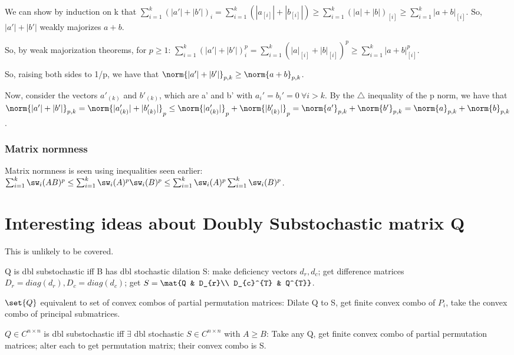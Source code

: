 \documentclass[10pt]{amsart}
\begin{document}
We can show by induction on k that $\sum_{i=1}^{k}(|a'| + |b'|)_{i} =  \sum_{i=1}^{k} (|a_{[i]}| + |b_{[i]}|) \geq \sum_{i=1}^{k} (|a| + |b|)_{[i]} \geq \sum_{i=1}^{k}|a+b|_{[i]}$. So, $|a'| + |b'|$ weakly majorizes $a + b$.

So, by weak majorization theorems, for $p \geq 1$: $\sum_{i=1}^{k} (|a'| + |b'|)_{i}^{p} = \sum_{i=1}^{k} (|a|_{[i]} + |b|_{[i]})^{p} \geq \sum_{i=1}^{k}|a+b|_{[i]}^{p}$.

So, raising both sides to 1/p, we have that $\norm{|a'| + |b'|}_{p, k} \geq \norm{a+b}_{p, k}$.

Now, consider the vectors $a'_{(k)}$ and $b'_{(k)}$, which are a' and b' with $a_{i}' = b_{i}' = 0\ \forall i>k$. By the $\triangle$ inequality of the p norm, we have that $\norm{|a'| + |b'|}_{p, k} = \norm{|a'_{(k)}| + |b'_{(k)}|}_{p} \leq \norm{|a'_{(k)}|}_{p} + \norm{|b'_{(k)}|}_{p} = \norm{a'}_{p,k} + \norm{b'}_{p,k} = \norm{a}_{p,k} + \norm{b}_{p,k} $. \finish

\subsubsection{Matrix normness}
Matrix normness is seen using inequalities seen earlier:\\
$\sum_{i=1}^{k}\sw_{i}(AB)^{p} \leq \sum_{i=1}^{k}\sw_{i}(A)^{p}\sw_{i}(B)^{p}\leq \sum_{i=1}^{k}\sw_{i}(A)^{p}\sum_{i=1}^{k}\sw_{i}(B)^{p}$.

\section{Interesting ideas about Doubly Substochastic matrix Q}
This is unlikely to be covered.

Q is dbl substochastic iff B has dbl stochastic dilation S: make deficiency vectors $d_{r}, d_{c}$; get difference matrices $D_{r}  = diag(d_{r}), D_{c}  = diag(d_{c})$; get $S = \mat{Q & D_{r}\\ D_{c}^{T} & Q^{T}}$.

$\set{Q}$ equivalent to set of convex combos of partial permutation matrices: Dilate Q to S, get finite convex combo of $P_{i}$, take the convex combo of principal submatrices.

$Q \in C^{n \times n}$ is dbl substochastic iff $\exists$ dbl stochastic $S\in C^{n\times n}$ with $A \geq B$: Take any Q, get finite convex combo of partial permutation matrices; alter each to get permutation matrix; their convex combo is S.
\end{document}
